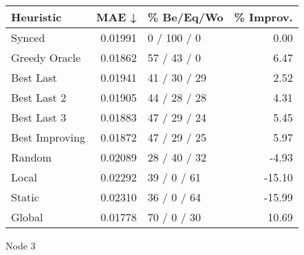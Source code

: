 \begin{tabular}{lrlr}
\toprule
\textbf{Heuristic} & \textbf{MAE ↓} & \textbf{\% Be/Eq/Wo} & \textbf{\% Improv.} \\
\midrule
            Synced &        0.01991 &          0 / 100 / 0 &                0.00 \\
     Greedy Oracle &        0.01862 &          57 / 43 / 0 &                6.47 \\
         Best Last &        0.01941 &         41 / 30 / 29 &                2.52 \\
       Best Last 2 &        0.01905 &         44 / 28 / 28 &                4.31 \\
       Best Last 3 &        0.01883 &         47 / 29 / 24 &                5.45 \\
    Best Improving &        0.01872 &         47 / 29 / 25 &                5.97 \\
            Random &        0.02089 &         28 / 40 / 32 &               -4.93 \\
             Local &        0.02292 &          39 / 0 / 61 &              -15.10 \\
            Static &        0.02310 &          36 / 0 / 64 &              -15.99 \\
            Global &        0.01778 &          70 / 0 / 30 &               10.69 \\
\bottomrule
\end{tabular}
\caption{Node 3}
\label{tab:non_lr05_le2_bs2_3}
